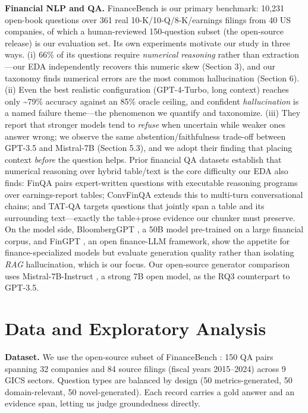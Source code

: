 \documentclass[11pt]{article}
\begin{document}
\textbf{Financial NLP and QA.} FinanceBench
\citep{islam2023financebench} is our primary benchmark: 10,231 open-book
questions over 361 real 10-K/10-Q/8-K/earnings filings from 40 US
companies, of which a human-reviewed 150-question subset (the
open-source release) is our evaluation set. Its own experiments motivate
our study in three ways. (i) 66\% of its questions require
\emph{numerical reasoning} rather than extraction---our EDA
independently recovers this numeric skew (Section 3), and our taxonomy
finds numerical errors are the most common hallucination (Section 6).
(ii) Even the best realistic configuration (GPT-4-Turbo, long context)
reaches only \textasciitilde79\% accuracy against an 85\% oracle
ceiling, and confident \emph{hallucination} is a named failure
theme---the phenomenon we quantify and taxonomize. (iii) They report
that stronger models tend to \emph{refuse} when uncertain while weaker
ones answer wrong; we observe the same abstention/faithfulness trade-off
between GPT-3.5 and Mistral-7B (Section 5.3), and we adopt their finding
that placing context \emph{before} the question helps. Prior financial
QA datasets establish that numerical reasoning over hybrid table/text is
the core difficulty our EDA also finds: FinQA \citep{chen2021finqa}
pairs expert-written questions with executable reasoning programs over
earnings-report tables; ConvFinQA \citep{chen2022convfinqa} extends this
to multi-turn conversational chains; and TAT-QA \citep{zhu2021tatqa}
targets questions that jointly span a table and its surrounding
text---exactly the table+prose evidence our chunker must preserve. On
the model side, BloombergGPT \citep{wu2023bloomberggpt}, a 50B model
pre-trained on a large financial corpus, and FinGPT
\citep{yang2023fingpt}, an open finance-LLM framework, show the appetite
for finance-specialized models but evaluate generation quality rather
than isolating \emph{RAG} hallucination, which is our focus. Our
open-source generator comparison uses Mistral-7B-Instruct
\citep{jiang2023mistral}, a strong 7B open model, as the RQ3 counterpart
to GPT-3.5.

\hypertarget{data-and-exploratory-analysis}{%
\section{Data and Exploratory
Analysis}\label{data-and-exploratory-analysis}}

\textbf{Dataset.} We use the open-source subset of FinanceBench
\citep{islam2023financebench}: 150 QA pairs spanning 32 companies and 84
source filings (fiscal years 2015--2024) across 9 GICS sectors. Question
types are balanced by design (50 metrics-generated, 50 domain-relevant,
50 novel-generated). Each record carries a gold answer and an evidence
span, letting us judge groundedness directly.
\end{document}
